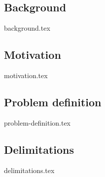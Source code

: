 \subsection{Background}
{background.tex}


\subsection{Motivation}
{motivation.tex}


\subsection{Problem definition}
\label{sec:problemdefinition}
{problem-definition.tex}





\subsection{Delimitations}
{delimitations.tex}



